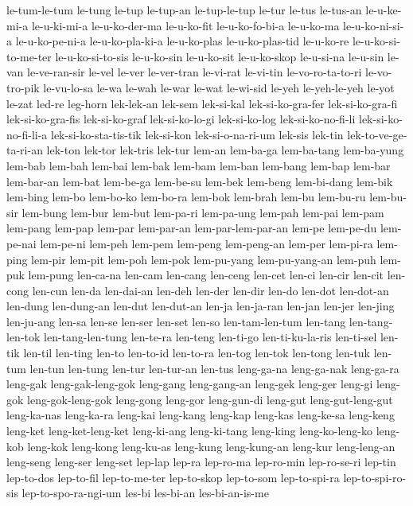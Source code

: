 {le-tum-le-tum le-tung le-tup le-tup-an le-tup-le-tup le-tur le-tus
le-tus-an le-u-ke-mi-a le-u-ki-mi-a le-u-ko-der-ma le-u-ko-fit
le-u-ko-fo-bi-a le-u-ko-ma le-u-ko-ni-si-a le-u-ko-pe-ni-a
le-u-ko-pla-ki-a le-u-ko-plas le-u-ko-plas-tid le-u-ko-re
le-u-ko-si-to-me-ter le-u-ko-si-to-sis le-u-ko-sin le-u-ko-sit
le-u-ko-skop le-u-si-na le-u-sin le-van le-ve-ran-sir le-vel le-ver
le-ver-tran le-vi-rat le-vi-tin le-vo-ro-ta-to-ri le-vo-tro-pik
le-vu-lo-sa le-wa le-wah le-war le-wat le-wi-sid le-yeh le-yeh-le-yeh
le-yot le-zat led-re leg-horn lek-lek-an lek-sem lek-si-kal
lek-si-ko-gra-fer lek-si-ko-gra-fi lek-si-ko-gra-fis lek-si-ko-graf
lek-si-ko-lo-gi lek-si-ko-log lek-si-ko-no-fi-li lek-si-ko-no-fi-li-a
lek-si-ko-sta-tis-tik lek-si-kon lek-si-o-na-ri-um lek-sis lek-tin
lek-to-ve-ge-ta-ri-an lek-ton lek-tor lek-tris lek-tur lem-an lem-ba-ga
lem-ba-tang lem-ba-yung lem-bab lem-bah lem-bai lem-bak lem-bam lem-ban
lem-bang lem-bap lem-bar lem-bar-an lem-bat lem-be-ga lem-be-su lem-bek
lem-beng lem-bi-dang lem-bik lem-bing lem-bo lem-bo-ko lem-bo-ra lem-bok
lem-brah lem-bu lem-bu-ru lem-bu-sir lem-bung lem-bur lem-but lem-pa-ri
lem-pa-ung lem-pah lem-pai lem-pam lem-pang lem-pap lem-par lem-par-an
lem-par-lem-par-an lem-pe lem-pe-du lem-pe-nai lem-pe-ni lem-peh lem-pem
lem-peng lem-peng-an lem-per lem-pi-ra lem-ping lem-pir lem-pit lem-poh
lem-pok lem-pu-yang lem-pu-yang-an lem-puh lem-puk lem-pung len-ca-na
len-cam len-cang len-ceng len-cet len-ci len-cir len-cit len-cong len-cun
len-da len-dai-an len-deh len-der len-dir len-do len-dot len-dot-an
len-dung len-dung-an len-dut len-dut-an len-ja len-ja-ran len-jan len-jer
len-jing len-ju-ang len-sa len-se len-ser len-set len-so len-tam-len-tum
len-tang len-tang-len-tok len-tang-len-tung len-te-ra len-teng len-ti-go
len-ti-ku-la-ris len-ti-sel len-tik len-til len-ting len-to len-to-id
len-to-ra len-tog len-tok len-tong len-tuk len-tum len-tun len-tung
len-tur len-tur-an len-tus leng-ga-na leng-ga-nak leng-ga-ra leng-gak
leng-gak-leng-gok leng-gang leng-gang-an leng-gek leng-ger leng-gi
leng-gok leng-gok-leng-gok leng-gong leng-gor leng-gun-di leng-gut
leng-gut-leng-gut leng-ka-nas leng-ka-ra leng-kai leng-kang leng-kap
leng-kas leng-ke-sa leng-keng leng-ket leng-ket-leng-ket leng-ki-ang
leng-ki-tang leng-king leng-ko-leng-ko leng-kob leng-kok leng-kong
leng-ku-as leng-kung leng-kung-an leng-kur leng-leng-an leng-seng leng-ser
leng-set lep-lap lep-ra lep-ro-ma lep-ro-min lep-ro-se-ri lep-tin
lep-to-dos lep-to-fil lep-to-me-ter lep-to-skop lep-to-som lep-to-spi-ra
lep-to-spi-ro-sis lep-to-spo-ra-ngi-um les-bi les-bi-an les-bi-an-is-me
}
